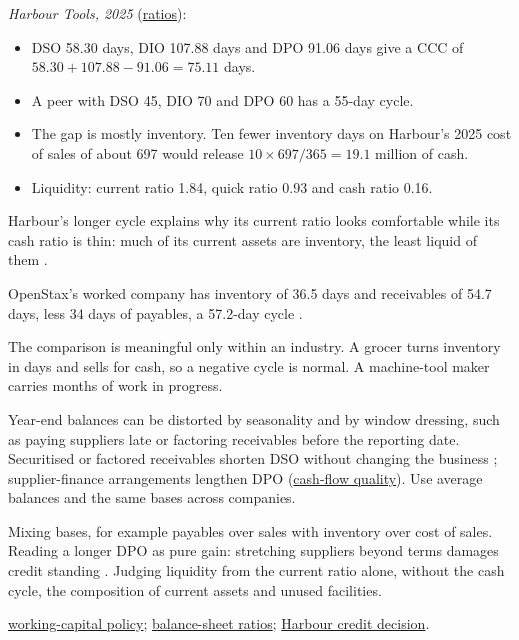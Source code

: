 \begin{qfmethod}
 \emph{Harbour Tools, 2025} (\hyperref[meth:financial-ratio-families]{ratios}):
\begin{itemize}
\item DSO 58.30 days, DIO 107.88 days and DPO 91.06 days give a CCC of $58.30+107.88-91.06=75.11$ days.
\item A peer with DSO 45, DIO 70 and DPO 60 has a 55-day cycle.
\item The gap is mostly inventory. Ten fewer inventory days on Harbour's 2025 cost of sales of about 697 would release $10\times697/365=19.1$ million of cash.
\item Liquidity: current ratio 1.84, quick ratio 0.93 and cash ratio 0.16.
\end{itemize}
Harbour's longer cycle explains why its current ratio looks comfortable while its cash ratio is thin: much of its current assets are inventory, the least liquid of them \citep[p.~539]{financial-statement-analysis-2009}.

OpenStax's worked company has inventory of 36.5 days and receivables of 54.7 days, less 34 days of payables, a 57.2-day cycle \citep[sec.~19.1]{principles-of-finance-2026}.

The comparison is meaningful only within an industry. A grocer turns inventory in days and sells for cash, so a negative cycle is normal. A machine-tool maker carries months of work in progress.

 Year-end balances can be distorted by seasonality and by window dressing, such as paying suppliers late or factoring receivables before the reporting date. Securitised or factored receivables shorten DSO without changing the business \citep[pp.~537--539]{financial-statement-analysis-2009}; supplier-finance arrangements lengthen DPO (\hyperref[meth:cash-flow-balance-sheet-quality]{cash-flow quality}). Use average balances and the same bases across companies.

 Mixing bases, for example payables over sales with inventory over cost of sales. Reading a longer DPO as pure gain: stretching suppliers beyond terms damages credit standing \citep[sec.~19.1]{principles-of-finance-2026}. Judging liquidity from the current ratio alone, without the cash cycle, the composition of current assets and unused facilities.

 \hyperref[meth:working-capital-policy]{working-capital policy}; \hyperref[meth:balance-sheet-ratios]{balance-sheet ratios}; \hyperref[ex:integrated-credit-decision]{Harbour credit decision}.

\end{qfmethod}


